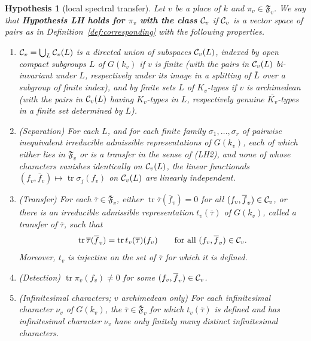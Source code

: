 \documentclass[12pt,letterpaper,openany]{book}
\theoremstyle{plain}
\newtheorem{hypothesis}[theorem]{Hypothesis}
\theoremstyle{definition}
\theoremstyle{remark}
\theoremstyle{remark}
\newcommand{\tr}{\operatorname{tr}}
\begin{document}
\begin{hypothesis}[local spectral transfer]\label{hyp:LH}
Let $v$ be a place of $k$ and $\pi_v\in\mathfrak{F}_v$. We say that
{\bf Hypothesis LH holds for
$\pi_v$ with the class ${\cal C}_v$} if ${\cal C}_v$ is a vector space of
pairs as in Definition~\ref{def:corresponding} with the following
properties.
\begin{enumerate}
\item[(LH0)] ${\cal C}_v=\bigcup_L{\cal C}_v(L)$ is a directed union of
subspaces ${\cal C}_v(L)$, indexed by open compact subgroups $L$ of
$G(k_v)$ if $v$ is finite (with the pairs in ${\cal C}_v(L)$ bi-invariant
under $L$, respectively under its image in a splitting of $\overline{L}$
over a subgroup of finite index), and by finite sets $L$ of
$K_v$-types if $v$ is archimedean (with the pairs in ${\cal C}_v(L)$
having $K_v$-types in $L$, respectively genuine $\overline{K_v}$-types in
a finite set determined by $L$).
\item[(LH1)] (Separation) For each $L$, and for each finite family
$\sigma_1,\dots,\sigma_r$ of pairwise inequivalent irreducible
admissible representations of $G(k_v)$, each of which either lies in
$\mathfrak{F}_v$ or is a transfer in the sense of (LH2), and none of whose
characters vanishes
identically on ${\cal C}_v(L)$, the linear functionals
$(f_v,\overline{f}_v)\longmapsto\tr \sigma_j(f_v)$ on
${\cal C}_v(L)$ are linearly independent.
\item[(LH2)] (Transfer) For each
$\overline{\tau}\in\overline{\mathfrak{F}}_v$, either
$\tr \overline{\tau}(\overline{f}_v)=0$ for all
$(f_v,\overline{f}_v)\in{\cal C}_v$, or there is an irreducible
admissible representation $t_v(\overline{\tau})$ of $G(k_v)$, called a
\emph{transfer} of $\overline\tau$, such that
\[
\tr \overline{\tau}(\overline{f}_v)=\tr t_v(\overline{\tau})(f_v)
\qquad\text{for all }(f_v,\overline{f}_v)\in{\cal C}_v .
\]
Moreover, $t_v$ is injective on the set of $\overline{\tau}$ for which it
is defined.
\item[(LH3)] (Detection) $\tr \pi_v(f_v)\neq 0$ for some
$(f_v,\overline{f}_v)\in{\cal C}_v$.
\item[(LH4)] (Infinitesimal characters; $v$ archimedean only) For each
infinitesimal character $\nu_v$ of $G(k_v)$, the
$\overline\tau\in\overline{\mathfrak{F}}_v$
for which $t_v(\overline\tau)$ is defined and has infinitesimal character
$\nu_v$ have only finitely many distinct infinitesimal characters.
\end{enumerate}
\end{hypothesis}
\end{document}
